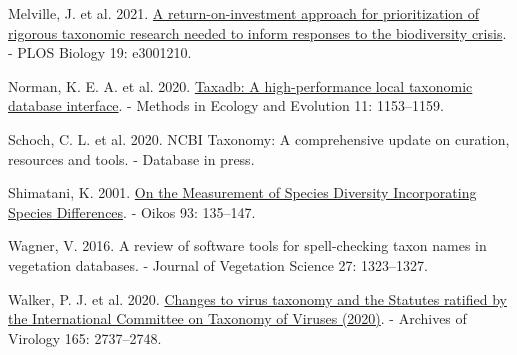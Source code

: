 \documentclass[11pt]{article}
\newlength{\cslhangindent}
\newenvironment{CSLReferences}[2] %
 {%
  \setlength{\parindent}{0pt}
  \ifodd #1 \everypar{\setlength{\hangindent}{\cslhangindent}}\ignorespaces\fi
  \ifnum #2 > 0
  \setlength{\parskip}{#2\baselineskip}
  \fi
 }%
 {}
\begin{document}
\begin{CSLReferences}{1}{0}
\leavevmode{}%
Melville, J. et al. 2021.
\href{https://doi.org/10.1371/journal.pbio.3001210}{A
return-on-investment approach for prioritization of rigorous taxonomic
research needed to inform responses to the biodiversity crisis}. - PLOS
Biology 19: e3001210.

\leavevmode{}%
Norman, K. E. A. et al. 2020.
\href{https://doi.org/10.1111/2041-210X.13440}{Taxadb: A
high-performance local taxonomic database interface}. - Methods in
Ecology and Evolution 11: 1153--1159.

\leavevmode{}%
Schoch, C. L. et al. 2020. NCBI Taxonomy: A comprehensive update on
curation, resources and tools. - Database in press.

\leavevmode{}%
Shimatani, K. 2001. \href{https://www.jstor.org/stable/3547217}{On the
Measurement of Species Diversity Incorporating Species Differences}. -
Oikos 93: 135--147.

\leavevmode{}%
Wagner, V. 2016. A review of software tools for spell-checking taxon
names in vegetation databases. - Journal of Vegetation Science 27:
1323--1327.

\leavevmode{}%
Walker, P. J. et al. 2020.
\href{https://doi.org/10.1007/s00705-020-04752-x}{Changes to virus
taxonomy and the Statutes ratified by the International Committee on
Taxonomy of Viruses (2020)}. - Archives of Virology 165: 2737--2748.

\end{CSLReferences}
\end{document}
